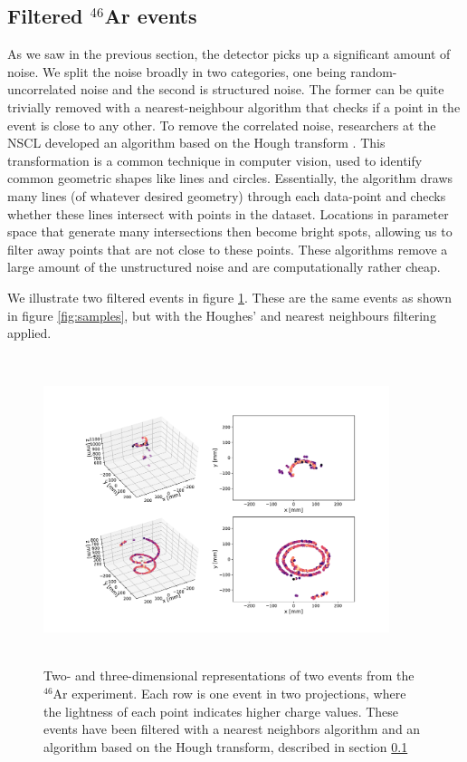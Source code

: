 \documentclass[preprint,12pt]{elsarticle}
\begin{document}
\subsection{Filtered \texorpdfstring{${}^{46}$Ar}{46Ar} events}\label{sec:filtered}

As we saw in the previous section, the detector picks up a significant amount of noise. We split the noise broadly in two categories,  one being random-uncorrelated noise and the second is structured noise. The former can be quite trivially removed with a nearest-neighbour algorithm that checks if a point in the event is close to any other. To remove the correlated noise, researchers at the NSCL developed an algorithm based on the Hough transform \cite{Newman1972}. This transformation is a common technique in computer vision, used to identify common geometric shapes like lines and circles. Essentially, the algorithm draws many lines (of whatever desired geometry) through each data-point and checks whether these lines intersect with points in the dataset. Locations in parameter space that generate many intersections then become bright spots, allowing us to filter away points that are not close to these points. These algorithms remove a large amount of the unstructured noise and are computationally rather cheap.

We illustrate two filtered events in figure \ref{fig:samples_filtered}. These are the same events as shown in figure \ref{fig:samples}, but with the Houghes' and nearest neighbours filtering applied. 

\begin{figure}[ht]
\centering
\includegraphics[width=0.9\textwidth, height=9cm]{plots/display_eventsclean_.pdf}
\caption[Displaying filtered events in 2D and 3D]{Two- and three-dimensional representations of two events from the ${}^{46}$Ar experiment. Each row is one event in two projections, where the lightness of each point indicates higher charge values. These events have been filtered with a nearest neighbors algorithm and an algorithm based on the Hough transform, described in section \ref{sec:filtered}}\label{fig:samples_filtered}
\end{figure}
\end{document}
